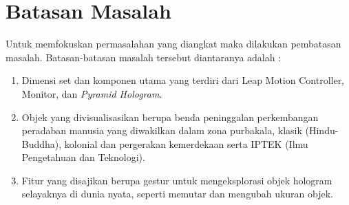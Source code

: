 \section{Batasan Masalah}
\vspace{1ex}
	Untuk memfokuskan permasalahan yang diangkat maka dilakukan pembatasan masalah. Batasan-batasan masalah tersebut diantaranya adalah :
	\vspace{0.5ex}
	\begin{enumerate} [nolistsep]
		\item Dimensi set dan komponen utama yang terdiri dari Leap Motion Controller, Monitor, dan \textit{Pyramid Hologram}.
		\vspace{0.5ex}
		
		\item Objek yang divisualisasikan berupa benda peninggalan perkembangan peradaban manusia  yang diwakilkan dalam zona purbakala, klasik (Hindu-Buddha), kolonial dan pergerakan kemerdekaan serta IPTEK (Ilmu Pengetahuan dan Teknologi).
		\vspace{0.5ex}
				
		\item Fitur yang disajikan berupa gestur untuk mengeksplorasi objek hologram selayaknya di dunia nyata, seperti memutar dan mengubah ukuran objek.
		\vspace{0.5ex}
	\end{enumerate}
	\vspace{2ex}

